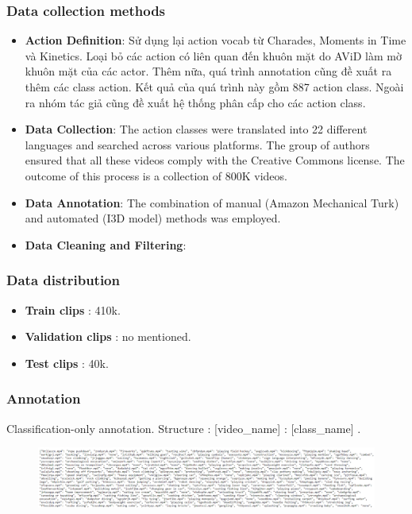 \documentclass[10pt,onecolumn,letterpaper]{article}
\begin{document}
\subsubsection{Data collection methods}
\begin{itemize}
	\item \textbf{Action Definition}: Sử dụng lại action vocab từ Charades, Moments in Time và Kinetics. Loại bỏ các action có liên quan đến khuôn mặt do AViD làm mờ khuôn mặt của các actor. Thêm nữa, quá trình annotation cũng đề xuất ra thêm các class action. Kết quả của quá trình này gồm 887 action class. Ngoài ra nhóm tác giả cũng đề xuất hệ thống phân cấp cho các action class.
	
	\item \textbf{Data Collection}: The action classes were translated into 22 different languages and searched across various platforms. The group of authors ensured that all these videos comply with the Creative Commons license. The outcome of this process is a collection of 800K videos.
	
	\item \textbf{Data Annotation}: The combination of manual (Amazon Mechanical Turk) and automated (I3D model) methods was employed.
	
	\item \textbf{Data Cleaning and Filtering}:
\end{itemize}

\subsubsection{Data distribution}

\begin{itemize}
	\item \textbf{Train clips} : 410k.
	\item \textbf{Validation clips} : no mentioned.
	\item \textbf{Test clips} : 40k. 
\end{itemize}

\subsubsection{Annotation}

Classification-only annotation. Structure : [video\_name] : [class\_name] .

\begin{figure}[h]
	\centering
	\includegraphics[width=0.7\linewidth]{"fig_info/fig6/Screenshot 2024-02-13 022922"}
	\caption{}
	\label{fig:screenshot-2024-02-13-022922}
\end{figure}
\end{document}
